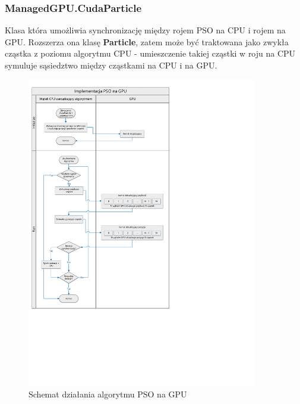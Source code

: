\documentclass[12pt, twoside, openany, abstract=on]{report}
\theoremstyle{definition}
\begin{document}
\subsubsection{ManagedGPU.CudaParticle} 
Klasa która umożliwia synchronizację między rojem PSO na CPU i rojem na GPU. Rozszerza ona klasę \textbf{Particle}, zatem może być traktowana jako zwykła cząstka z poziomu algorytmu CPU - umieszczenie takiej cząstki w roju na CPU symuluje sąsiedztwo między cząstkami na CPU i na GPU.

\newpage

\begin{figure}[H]
    \centering
 \includegraphics[width=0.9\textwidth, clip, trim=0.0cm 10cm 11cm 0cm]{gpu_diagram.pdf}
 \caption{Schemat działania algorytmu PSO na GPU}
 \label{fig:gpu}
\end{figure}
\end{document}
